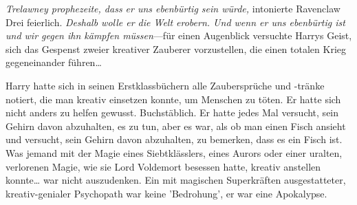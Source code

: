

\emph{Trelawney prophezeite, dass er uns ebenbürtig sein würde,} intonierte Ravenclaw Drei feierlich. \emph{Deshalb wolle er die Welt erobern. Und wenn er uns ebenbürtig ist und wir gegen ihn kämpfen müssen}—für einen Augenblick versuchte Harrys Geist, sich das Gespenst zweier kreativer Zauberer vorzustellen, die einen totalen Krieg gegeneinander führen…

Harry hatte sich in seinen Erstklassbüchern alle Zaubersprüche und -tränke notiert, die man kreativ einsetzen konnte, um Menschen zu töten. Er hatte sich nicht anders zu helfen gewusst. Buchstäblich. Er hatte jedes Mal versucht, sein Gehirn davon abzuhalten, es zu tun, aber es war, als ob man einen Fisch ansieht und versucht, sein Gehirn davon abzuhalten, zu bemerken, dass es ein Fisch ist. Was jemand mit der Magie eines Siebtklässlers, eines Aurors oder einer uralten, verlorenen Magie, wie sie Lord Voldemort besessen hatte, kreativ anstellen konnte… war nicht auszudenken. Ein mit magischen Superkräften ausgestatteter, kreativ-genialer Psychopath war keine 'Bedrohung', er war eine Apokalypse.



